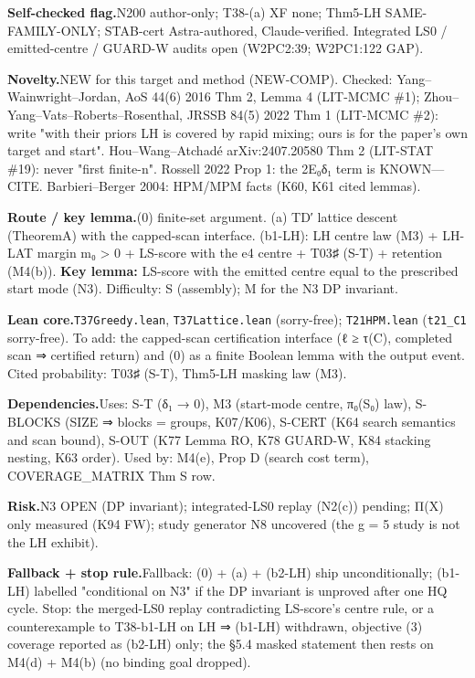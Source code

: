 {\par\smallskip\noindent\textbf{Self-checked flag.}\enspace N200 author-only; T38-(a) XF none; Thm5-LH SAME-FAMILY-ONLY; STAB-cert Astra-authored, Claude-verified. Integrated LS0 / emitted-centre / GUARD-W audits open (W2PC2:39; W2PC1:122 GAP).
\par\smallskip\noindent\textbf{Novelty.}\enspace NEW for this target and method (NEW-COMP). Checked: Yang–Wainwright–Jordan, AoS 44(6) 2016 Thm 2, Lemma 4 (LIT-MCMC \#1); Zhou–Yang–Vats–Roberts–Rosenthal, JRSSB 84(5) 2022 Thm 1 (LIT-MCMC \#2): write "with their priors LH is covered by rapid mixing; ours is for the paper's own target and start". Hou–Wang–Atchadé arXiv:2407.20580 Thm 2 (LIT-STAT \#19): never "first finite-n". Rossell 2022 Prop 1: the 2E₀δ₁ term is KNOWN—CITE. Barbieri–Berger 2004: HPM/MPM facts (K60, K61 cited lemmas).
\par\smallskip\noindent\textbf{Route / key lemma.}\enspace (0) finite-set argument. (a) TD′ lattice descent (TheoremA) with the capped-scan interface. (b1-LH): LH centre law (M3) + LH-LAT margin m₀ \textgreater{} 0 + LS-score with the e4 centre + T03♯ (S-T) + retention (M4(b)). \textbf{Key lemma:} LS-score with the emitted centre equal to the prescribed start mode (N3). Difficulty: S (assembly); M for the N3 DP invariant.
\par\smallskip\noindent\textbf{Lean core.}\enspace \texttt{T37Greedy.lean}, \texttt{T37Lattice.lean} (sorry-free); \texttt{T21HPM.lean} (\texttt{t21\_C1} sorry-free). To add: the capped-scan certification interface (ℓ ≥ τ(C), completed scan ⇒ certified return) and (0) as a finite Boolean lemma with the output event. Cited probability: T03♯ (S-T), Thm5-LH masking law (M3).
\par\smallskip\noindent\textbf{Dependencies.}\enspace Uses: S-T (δ₁ → 0), M3 (start-mode centre, π₀(S₀) law), S-BLOCKS (SIZE ⇒ blocks = groups, K07/K06), S-CERT (K64 search semantics and scan bound), S-OUT (K77 Lemma RO, K78 GUARD-W, K84 stacking nesting, K63 order). Used by: M4(e), Prop D (search cost term), COVERAGE\_MATRIX Thm S row.
\par\smallskip\noindent\textbf{Risk.}\enspace N3 OPEN (DP invariant); integrated-LS0 replay (N2(c)) pending; Π(X) only measured (K94 FW); study generator N8 uncovered (the g = 5 study is not the LH exhibit).
\par\smallskip\noindent\textbf{Fallback + stop rule.}\enspace Fallback: (0) + (a) + (b2-LH) ship unconditionally; (b1-LH) labelled "conditional on N3" if the DP invariant is unproved after one HQ cycle. Stop: the merged-LS0 replay contradicting LS-score's centre rule, or a counterexample to T38-b1-LH on LH ⇒ (b1-LH) withdrawn, objective (3) coverage reported as (b2-LH) only; the §5.4 masked statement then rests on M4(d) + M4(b) (no binding goal dropped).
}
